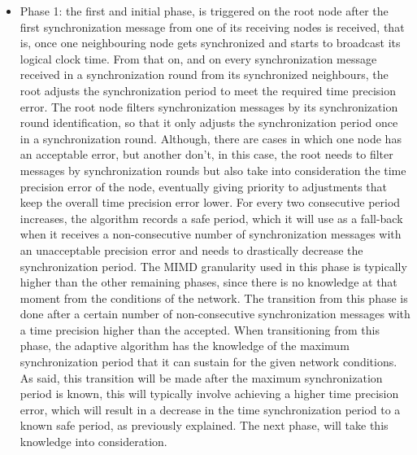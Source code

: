 \documentclass[11pt,a4]{article}
\begin{document}
\begin{multicols}{2}
\begin{itemize}
\item Phase 1: the first and initial phase, is triggered on the root node after the first synchronization message from one of its receiving nodes is received, that is, once one neighbouring node gets synchronized and starts to broadcast its logical clock time. From that on, and on every synchronization message received in a synchronization round from its synchronized neighbours, the root adjusts the synchronization period to meet the required time precision error. The root node filters synchronization messages by its synchronization round identification, so that it only adjusts the synchronization period once in a synchronization round. Although, there are cases in which one node has an acceptable error, but another don't, in this case, the root needs to filter messages by synchronization rounds but also take into consideration the time precision error of the node, eventually giving priority to adjustments that keep the overall time precision error lower. For every two consecutive period increases, the algorithm records a safe period, which it will use as a fall-back when it receives a non-consecutive number of synchronization messages with an unacceptable precision error and needs to drastically decrease the synchronization period. The MIMD granularity used in this phase is typically higher than the other remaining phases, since there is no knowledge at that moment from the conditions of the network. The transition from this phase is done after a certain number of non-consecutive synchronization messages with a time precision higher than the accepted. When transitioning from this phase, the adaptive algorithm has the knowledge of the maximum synchronization period that it can sustain for the given network conditions. As said, this transition will be made after the maximum synchronization period is known, this will typically involve achieving a higher time precision error, which will result in a decrease in the time synchronization period to a known safe period, as previously explained. The next phase, will take this knowledge into consideration.


\end{itemize}
\end{multicols}
\end{document}
